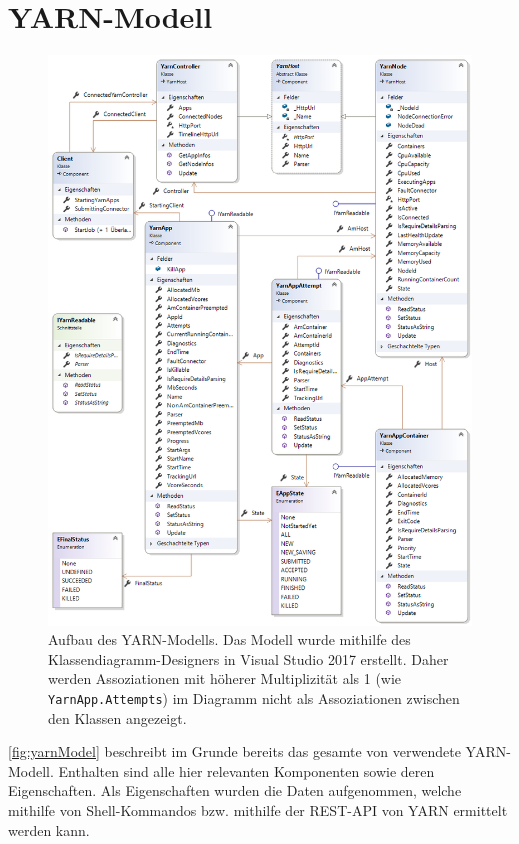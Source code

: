 \section{YARN-Modell}\label{sec:yarnModel}

\begin{figure}
    \centering
    \includegraphics[width=\columnwidth]{./images/yarnModel.png}
    \caption[Aufbau des YARN-Modells]{Aufbau des YARN-Modells. Das Modell wurde mithilfe des Klassendiagramm-Designers in Visual Studio 2017 erstellt. Daher werden Assoziationen mit höherer Multiplizität als 1 (wie \texttt{YarnApp.Attempts}) im Diagramm nicht als Assoziationen zwischen den Klassen angezeigt.}
    \label{fig:yarnModel}
\end{figure}

\autoref{fig:yarnModel} beschreibt im Grunde bereits das gesamte von \sS verwendete YARN-Modell. Enthalten sind alle hier relevanten Komponenten sowie deren Eigenschaften. Als Eigenschaften wurden die Daten aufgenommen, welche mithilfe von Shell-Kommandos bzw. mithilfe der REST-API von YARN ermittelt werden kann.

